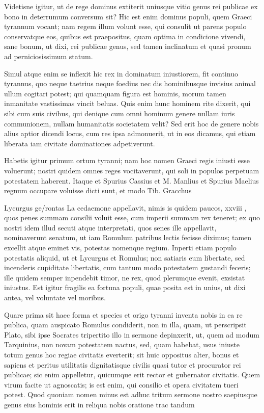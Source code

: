  Videtisne igitur, ut de rege dominus extiterit uniusque vitio genus rei publicae ex bono in deterrumum conversum sit? Hic est enim dominus populi, quem Graeci tyrannum vocant; nam regem illum volunt esse, qui consulit ut parens populo conservatque eos, quibus est praepositus, quam optima in condicione vivendi, sane bonum, ut dixi, rei publicae genus, sed tamen inclinatum et quasi pronum ad perniciosissimum statum.

 Simul atque enim se inflexit hic rex in dominatum iniustiorem, fit continuo tyrannus, quo neque taetrius neque foedius nec dis hominibusque invisius animal ullum cogitari potest; qui quamquam figura est hominis, morum tamen inmanitate vastissimas vincit beluas. Quis enim hunc hominem rite dixerit, qui sibi cum suis civibus, qui denique cum omni hominum genere nullam iuris communionem, nullam humanitatis societatem velit? Sed erit hoc de genere nobis alius aptior dicendi locus, cum res ipsa admonuerit, ut in eos dicamus, qui etiam liberata iam civitate dominationes adpetiverunt.

 Habetis igitur primum ortum tyranni; nam hoc nomen Graeci regis iniusti esse voluerunt; nostri quidem omnes reges vocitaverunt, qui soli in populos perpetuam potestatem haberent. Itaque et Spurius Cassius et M. Manlius et Spurius Maelius regnum occupare voluisse dicti sunt, et modo Tib. Gracchus

 Lycurgus ge/rontas La cedaemone appellavit, nimis is quidem paucos, xxviii , quos penes summam consilii voluit esse, cum imperii summam rex teneret; ex quo nostri idem illud secuti atque interpretati, quos senes ille appellavit, nominaverunt senatum, ut iam Romulum patribus lectis fecisse diximus; tamen excellit atque eminet vis, potestas nomenque regium. Inperti etiam populo potestatis aliquid, ut et Lycurgus et Romulus; non satiaris eum libertate, sed incenderis cupiditate libertatis, cum tantum modo potestatem gustandi feceris; ille quidem semper inpendebit timor, ne rex, quod plerumque evenit, exsistat iniustus. Est igitur fragilis ea fortuna populi, quae posita est in unius, ut dixi antea, vel voluntate vel moribus.

 Quare prima sit haec forma et species et origo tyranni inventa nobis in ea re publica, quam auspicato Romulus condiderit, non in illa, quam, ut perscripsit Plato, sibi ipse Socrates tripertito illo in sermone depinxerit, ut, quem ad modum Tarquinius, non novam potestatem nactus, sed, quam habebat, usus iniuste totum genus hoc regiae civitatis everterit; sit huic oppositus alter, bonus et sapiens et peritus utilitatis dignitatisque civilis quasi tutor et procurator rei publicae; sic enim appelletur, quicumque erit rector et gubernator civitatis. Quem virum facite ut agnoscatis; is est enim, qui consilio et opera civitatem tueri potest. Quod quoniam nomen minus est adhuc tritum sermone nostro saepiusque genus eius hominis erit in reliqua nobis oratione trac tandum

